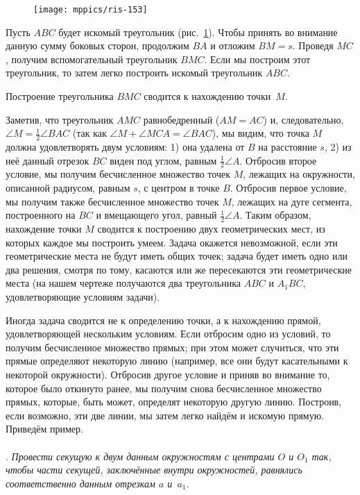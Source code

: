 \documentclass[oneside]{book}
\begin{document}
\begin{figure}
\centering
\texttt{[image: mppics/ris-153]}
\caption{}\label{1938/ris-153}
\end{figure}

Пусть $ABC$ будет искомый треугольник (рис.~\ref{1938/ris-153}).
Чтобы принять во внимание данную сумму боковых сторон, продолжим $BA$ и отложим $BM=s$.
Проведя $MC$, получим вспомогательный треугольник $BMC$.
Если мы построим этот треугольник, то затем легко построить искомый треугольник $ABC$.

Построение треугольника $BMC$ сводится к нахождению точки~$M$.

Заметив, что треугольник $AMC$ равнобедренный ($AM=AC$) и, следовательно, $\angle M =  \tfrac12\angle BAC$ (так как $\angle M+\angle MCA = \angle BAC$), мы видим, что точка $M$ должна удовлетворять двум условиям:
1) она удалена от $B$ на расстояние $s$, 
2) из неё данный отрезок $BC$ виден под углом, равным $\tfrac12\angle A$.
Отбросив второе условие, мы получим бесчисленное множество точек $M$, лежащих на окружности, описанной радиусом, равным $s$, с центром в точке $B$.
Отбросив первое условие, мы получим также бесчисленное множество точек $M$, лежащих на дуге сегмента, построенного на $BC$ и вмещающего угол, равный $\tfrac12\angle A$.
Таким образом, нахождение точки $M$ сводится к построению двух геометрических мест, из которых каждое мы построить умеем.
Задача окажется невозможной, если эти геометрические места не будут иметь общих точек;
задача будет иметь одно или два решения, смотря по тому, касаются или же пересекаются эти геометрические места (на нашем чертеже получаются два треугольника $ABC$ и $A_1BC$, удовлетворяющие условиям задачи).

\medskip

Иногда задача сводится не к определению точки, а к нахождению прямой, удовлетворяющей нескольким условиям.
Если отбросим одно из условий, то получим бесчисленное множество прямых;
при этом может случиться, что эти прямые определяют некоторую линию (например, все они будут касательными к некоторой окружности).
Отбросив другое условие и приняв во внимание то, которое было откинуто ранее, мы получим снова бесчисленное множество прямых, которые, быть может, определят некоторую другую линию.
Построив, если возможно, эти две линии, мы затем легко найдём и искомую прямую.
Приведём пример.

\paragraph{}\label{1938/135}
.
\emph{Провести секущую к двум данным окружностям с центрами $O$ и $O_1$ так, чтобы части секущей, заключённые внутри окружностей, равнялись соответственно данным отрезкам $a$ и~$a_1$.}
\end{document}

